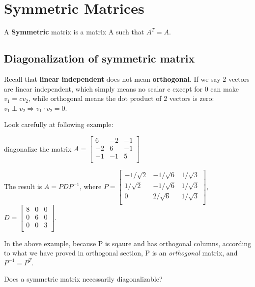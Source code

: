\chapter{Symmetric Matrices}

\begin{definition}
    A \textbf{Symmetric} matrix is a matrix A such that $A^{T} = A$.
\end{definition}


\section{Diagonalization of symmetric matrix}

Recall that \textbf{linear independent} does not mean \textbf{orthogonal}. If we say 2 vectors are linear independent, which simply means no scalar c except for 0 can make $v_1 = c v_2$, while orthogonal means the dot product of 2 vectors is zero: $v_1 \perp v_2 \Rightarrow v_1 \cdot v_2 = 0$.

Look carefully at following example:
\begin{eg}
    diagonalize the matrix $A = \begin{bmatrix}
        6 & -2 & -1 \\
        -2 & 6 & -1 \\
        -1 & -1 & 5 \\
    \end{bmatrix}$

    The result is $A = PDP^{-1}$, where $P = \begin{bmatrix}
        -1/\sqrt{2} & -1/\sqrt{6} & 1/\sqrt{3} \\
        1/\sqrt{2} & -1/\sqrt{6} & 1/\sqrt{3} \\
        0 & 2/\sqrt{6} & 1/\sqrt{3} \\
    \end{bmatrix}$, $D = \begin{bmatrix}
        8 & 0 & 0 \\
        0 & 6 & 0 \\
        0 & 0 & 3 \\
    \end{bmatrix}$.
\end{eg}

In the above example, because P is sqaure and has orthogonal columns, according to what we have proved in orthogonal section, P is an \textit{orthogonal} matrix, and $P^{-1} = P ^T$.


\begin{remark}
    Does a symmetric matrix necessarily diagonalizable?
\end{remark}

